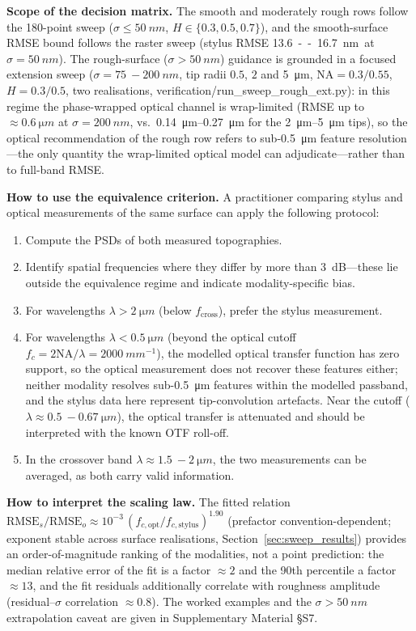 \documentclass[review,12pt]{elsarticle}
\begin{document}
\textbf{Scope of the decision matrix.} The smooth and moderately rough rows follow the 180-point sweep ($\sigma\le\SI{50}{nm}$, $H\in\{0.3,0.5,0.7\}$), and the smooth-surface RMSE bound follows the raster sweep (stylus RMSE \SI{13.6}--\SI{16.7}{nm} at $\sigma=\SI{50}{nm}$). The rough-surface ($\sigma>\SI{50}{nm}$) guidance is grounded in a focused extension sweep ($\sigma=\SI{75}{-}\SI{200}{nm}$, tip radii $0.5$, $2$ and \SI{5}{\micro m}, $\mathrm{NA}=0.3/0.55$, $H=0.3/0.5$, two realisations, verification/run\_sweep\_rough\_ext.py): in this regime the phase-wrapped optical channel is wrap-limited (RMSE up to $\approx\SI{0.6}{\micro m}$ at $\sigma=\SI{200}{nm}$, vs.\ \SIrange{0.14}{0.27}{\micro m} for the \SIrange{2}{5}{\micro m} tips), so the optical recommendation of the rough row refers to sub-\SI{0.5}{\micro m} feature resolution---the only quantity the wrap-limited optical model can adjudicate---rather than to full-band RMSE.

\textbf{How to use the equivalence criterion.} A practitioner comparing stylus and optical measurements of the same surface can apply the following protocol:
\begin{enumerate}
    \item Compute the PSDs of both measured topographies.
    \item Identify spatial frequencies where they differ by more than \SI{3}{dB}---these lie outside the equivalence regime and indicate modality-specific bias.
    \item For wavelengths $\lambda > \SI{2}{\micro m}$ (below $f_\mathrm{cross}$), prefer the stylus measurement.
    \item For wavelengths $\lambda < \SI{0.5}{\micro m}$ (beyond the optical cutoff $f_c = 2\mathrm{NA}/\lambda = \SI{2000}{mm^{-1}}$), the modelled optical transfer function has zero support, so the optical measurement does not recover these features either; neither modality resolves sub-\SI{0.5}{\micro m} features within the modelled passband, and the stylus data here represent tip-convolution artefacts. Near the cutoff ($\lambda \approx \SI{0.5}{-}\SI{0.67}{\micro m}$), the optical transfer is attenuated and should be interpreted with the known OTF roll-off.
    \item In the crossover band $\lambda \approx \SI{1.5}{-}\SI{2}{\micro m}$, the two measurements can be averaged, as both carry valid information.
\end{enumerate}

\textbf{How to interpret the scaling law.} The fitted relation $\mathrm{RMSE}_s/\mathrm{RMSE}_o \approx 10^{-3}\,(f_{c,\mathrm{opt}}/f_{c,\mathrm{stylus}})^{1.90}$ (prefactor convention-dependent; exponent stable across surface realisations, Section~\ref{sec:sweep_results}) provides an order-of-magnitude ranking of the modalities, not a point prediction: the median relative error of the fit is a factor $\approx2$ and the 90th percentile a factor $\approx13$, and the fit residuals additionally correlate with roughness amplitude (residual--$\sigma$ correlation $\approx0.8$). The worked examples and the $\sigma>\SI{50}{nm}$ extrapolation caveat are given in Supplementary Material \S S7.
\end{document}

